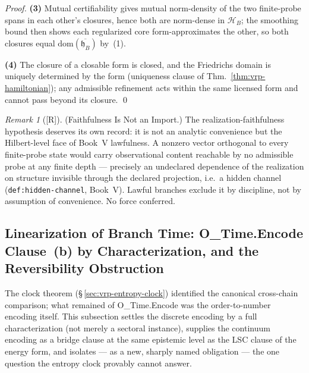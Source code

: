 \documentclass[12pt,oneside]{amsbook}
\theoremstyle{plain}
\theoremstyle{definition}
\theoremstyle{remark}
\newtheorem{remark}[theorem]{Remark}
\newcommand{\status}[1]{\textup{[#1]}}
\begin{document}
\begin{proof}
\textbf{(3)}  Mutual certifiability gives mutual norm-density of
the two finite-probe spans in each other's closures, hence both
are norm-dense in $\mathcal{H}_B$; the smoothing bound then shows
each regularized core form-approximates the other, so both
closures equal $\mathrm{dom}(\overline{\mathfrak{h}_B})$ by~(1).

\textbf{(4)}  The closure of a closable form is closed, and the
Friedrichs domain is uniquely determined by the form
(uniqueness clause of Thm.~\ref{thm:vrp-hamiltonian}); any
admissible refinement acts within the same licensed form and
cannot pass beyond its closure. \qed
\end{proof}

\begin{remark}[\status{R}]\label{rmk:vrp-ham-domain-faithfulness}
\textup{(Faithfulness Is Not an Import.)}
The realization-faithfulness hypothesis deserves its own record:
it is not an analytic convenience but the Hilbert-level face of
Book~V lawfulness.  A nonzero vector orthogonal to every
finite-probe state would carry observational content reachable by
no admissible probe at any finite depth --- precisely an
undeclared dependence of the realization on structure invisible
through the declared projection, i.e.\ a hidden channel
(\texttt{def:hidden-channel}, Book~V).  Lawful branches exclude
it by discipline, not by assumption of convenience.  No force
conferred.
\end{remark}

\subsection{Linearization of Branch Time: O\_Time.Encode
Clause~(b) by Characterization, and the Reversibility Obstruction}
\label{sec:vrp-time-linear}

The clock theorem (\S\,\ref{sec:vrp-entropy-clock}) identified the
canonical cross-chain comparison; what remained of
O\_Time.Encode was the order-to-number encoding itself.  This
subsection settles the discrete encoding by a full
characterization (not merely a sectoral instance), supplies the
continuum encoding as a bridge clause at the same epistemic level
as the LSC clause of the energy form, and isolates --- as a new,
sharply named obligation --- the one question the entropy clock
provably cannot answer.
\end{document}
